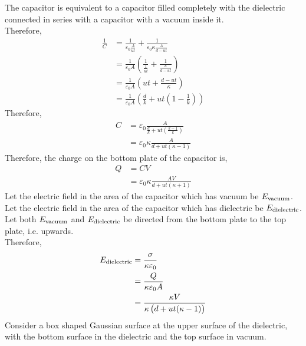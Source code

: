 \documentclass[fleqn, a4paper, 12pt, twoside]{article}
\theoremstyle{definition}
\theoremstyle{theorem}
\begin{document}
\begin{solution}
	The capacitor is equivalent to a capacitor filled completely with the dielectric connected in series with a capacitor with a vacuum inside it.\\
	Therefore,
	\begin{align*}
		\frac{1}{C} & = \frac{1}{\varepsilon_0 \frac{A}{u t}} + \frac{1}{\varepsilon_0 \kappa \frac{A}{d - u t}}            \\
                            & = \frac{1}{\varepsilon_0 A} \left( \frac{1}{\frac{1}{u t}} + \frac{1}{\frac{\kappa}{d - u t}} \right) \\
                            & = \frac{1}{\varepsilon_0 A} \left( u t + \frac{d - u t}{\kappa} \right)                               \\
                            & = \frac{1}{\varepsilon_0 A} \left( \frac{d}{k} + u t \left( 1 - \frac{1}{k} \right) \right)
	\end{align*}
	Therefore,
	\begin{align*}
		C & = \varepsilon_0 \frac{A}{\frac{d}{k} + u t \left( \frac{k - 1}{k} \right)} \\
                  & = \varepsilon_0 \kappa \frac{A}{d + u t (\kappa - 1)}
	\end{align*}
	Therefore, the charge on the bottom plate of the capacitor is,
	\begin{align*}
		Q & = C V \\
                  & = \varepsilon_0 \kappa \frac{A V}{d + u t (\kappa + 1)}
	\end{align*}
	Let the electric field in the area of the capacitor which has vacuum be $E_{\textnormal{vacuum}}$.\\
	Let the electric field in the area of the capacitor which has dielectric be $E_{\textnormal{dielectric}}$.\\
	Let both $E_{\textnormal{vacuum}}$ and $E_{\textnormal{dielectric}}$ be directed from the bottom plate to the top plate, i.e. upwards.\\
	Therefore,
	\begin{align*}
		E_{\textnormal{dielectric}} & = \frac{\sigma}{\kappa \varepsilon_0} \\
                                            & = \frac{Q}{\kappa \varepsilon_0 A}    \\
                                            & = \frac{\kappa V}{\kappa \left( d + u t (\kappa - 1) \right)}
	\end{align*}
	Consider a box shaped Gaussian surface at the upper surface of the dielectric, with the bottom surface in the dielectric and the top surface in vacuum.\\

\end{solution}
\end{document}
